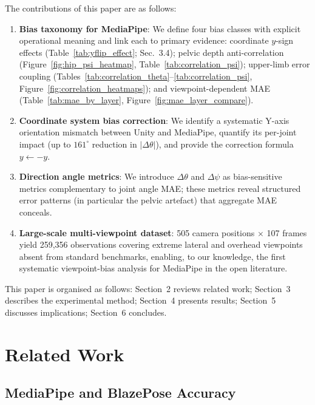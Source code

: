 \documentclass[english,fleqn]{ieej-e}
\begin{document}
The contributions of this paper are as follows:
\begin{enumerate}\itemsep0pt
  \item \textbf{Bias taxonomy for MediaPipe}: We define four bias classes
        with explicit operational meaning and link each to primary evidence:
        coordinate $y$-sign effects (Table~\ref{tab:yflip_effect};
        Sec.~3.4); pelvic depth anti-correlation
        (Figure~\ref{fig:hip_psi_heatmap}, Table~\ref{tab:correlation_psi});
        upper-limb error coupling
        (Tables~\ref{tab:correlation_theta}--\ref{tab:correlation_psi},
        Figure~\ref{fig:correlation_heatmaps}); and viewpoint-dependent MAE
        (Table~\ref{tab:mae_by_layer}, Figure~\ref{fig:mae_layer_compare}).
  \item \textbf{Coordinate system bias correction}: We identify a
        systematic Y-axis orientation mismatch between Unity and MediaPipe,
        quantify its per-joint impact (up to $161^{\circ}$ reduction in
        $|\Delta\theta|$), and provide the correction formula
        $y \leftarrow -y$.
  \item \textbf{Direction angle metrics}: We introduce $\Delta\theta$ and
        $\Delta\psi$ as bias-sensitive metrics complementary to joint angle
        MAE; these metrics reveal structured error patterns (in particular the
        pelvic artefact) that aggregate MAE conceals.
  \item \textbf{Large-scale multi-viewpoint dataset}: 505 camera positions
        $\times$ 107 frames yield 259,356 observations covering extreme
        lateral and overhead viewpoints absent from standard benchmarks,
        enabling, to our knowledge, the first systematic viewpoint-bias analysis
        for MediaPipe in the open literature.
\end{enumerate}

This paper is organised as follows:
Section~2 reviews related work;
Section~3 describes the experimental method;
Section~4 presents results;
Section~5 discusses implications;
Section~6 concludes.

\section{Related Work}

\subsection{MediaPipe and BlazePose Accuracy}
\end{document}
